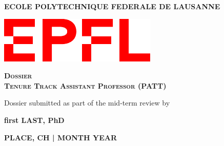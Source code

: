 \documentclass[11pt, notitlepage]{report}
\begin{document}
\begin{titlepage}
	\centering
	{\textbf{ECOLE POLYTECHNIQUE FEDERALE DE LAUSANNE}} \par
	\vspace{1 cm}
    \vspace{1 cm}
	\includegraphics[scale=0.6]{Figures/Logo_EPFL.pdf}\par\vspace{1cm}
  
	\vspace{1cm}
	{\scshape\Large\textbf{Dossier \\ Tenure Track Assistant Professor (PATT)}\par}
	\vspace{1 cm}

    
    Dossier submitted as part of the mid-term review by
    \vspace{0.5 cm}
    
	{\large\textbf{first LAST, PhD}\par}
	

	\vspace{12 cm}
	{\large \textbf{PLACE, CH | MONTH YEAR}\par}
\end{titlepage}




{\hypersetup{linkcolor=black}
\tableofcontents
}








%

\end{document}
